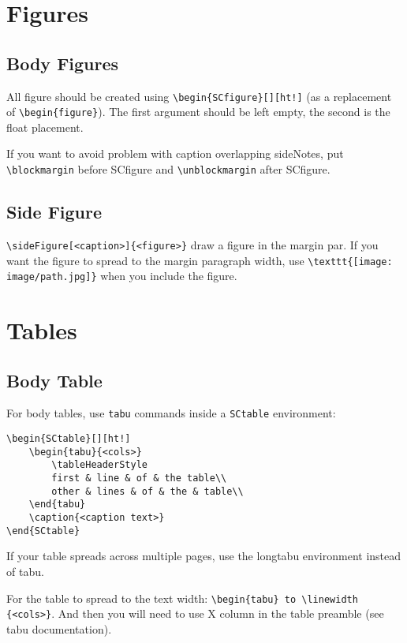 \documentclass[a4paper, 11pt, oneside, fleqn]{article}
\begin{document}
	
	\section{Figures}
	\subsection{Body Figures}
	All figure should be created using \lstinline[breaklines]|\begin{SCfigure}[][ht!]| (as a replacement of \lstinline[breaklines]|\begin{figure}|). The first argument should be left empty, the second is the float placement.
	
	If you want to avoid problem with caption overlapping sideNotes, put \lstinline[breaklines]|\blockmargin| before SCfigure and \lstinline[breaklines]|\unblockmargin| after SCfigure.
	
	\subsection{Side Figure}
	\lstinline[breaklines]|\sideFigure[<caption>]{<figure>}| draw a figure in the margin par. If you want the figure to spread to the margin paragraph width, use \lstinline[breaklines]|\texttt{[image: image/path.jpg]}| when you include the figure.
	
	
	\section{Tables}
	\subsection{Body Table}
	For body tables, use \lstinline[breaklines]|tabu| commands inside a \lstinline[breaklines]|SCtable| environment:
	\begin{lstlisting}
\begin{SCtable}[][ht!]
	\begin{tabu}{<cols>}
		\tableHeaderStyle
		first & line & of & the table\\
		other & lines & of & the & table\\
	\end{tabu}
	\caption{<caption text>}
\end{SCtable}
	\end{lstlisting}
	If your table spreads across multiple pages, use the longtabu environment instead of tabu.
	
	For the table to spread to the text width: \lstinline[breaklines]|\begin{tabu} to \linewidth {<cols>}|. And then you will need to use X column in the table preamble (see tabu documentation).
	
\end{document}
